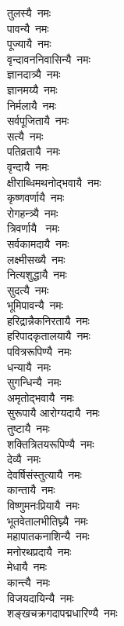 \begin{multicols}{2}
\begin{flushleft}
तुलस्यै~नमः\\
पावन्यै~नमः\\
पूज्यायै~नमः\\
वृन्दावननिवासिन्यै~नमः\\
ज्ञानदात्र्यै~नमः\\
ज्ञानमय्यै~नमः\\
निर्मलायै~नमः\\
सर्वपूजितायै~नमः\\
सत्यै~नमः\\
पतिव्रतायै~नमः\hfill{}‌\\
वृन्दायै~नमः\\
क्षीराब्धिमथनोद्भवायै~नमः\\
कृष्णवर्णायै~नमः\\
रोगहन्त्र्यै~नमः\\
त्रिवर्णायै ~नमः\\
सर्वकामदायै~नमः\\
लक्ष्मीसख्यै~नमः\\
नित्यशुद्धायै~नमः\\
सुदत्यै~नमः\\
भूमिपावन्यै~नमः\hfill{}‌\\
हरिद्रान्नैकनिरतायै~नमः\\
हरिपादकृतालयायै~नमः\\
पवित्ररूपिण्यै~नमः\\
धन्यायै~नमः\\
सुगन्धिन्यै~नमः\\
अमृतोद्भवायै~नमः\\
सुरूपायै आरोग्यदायै~नमः\\
तुष्टायै~नमः\\
शक्तित्रितयरूपिण्यै~नमः\\
देव्यै~नमः\hfill{}‌\\
देवर्षिसंस्तुत्यायै~नमः\\
कान्तायै~नमः\\
विष्णुमनःप्रियायै~नमः\\
भूतवेतालभीतिघ्न्यै~नमः\\
महापातकनाशिन्यै~नमः\\
मनोरथप्रदायै~नमः\\
मेधायै~नमः\\
कान्त्यै~नमः\\
विजयदायिन्यै~नमः\\
शङ्खचक्रगदापद्मधारिण्यै~नमः\hfill{}‌\\

\end{flushleft}
\end{multicols}
